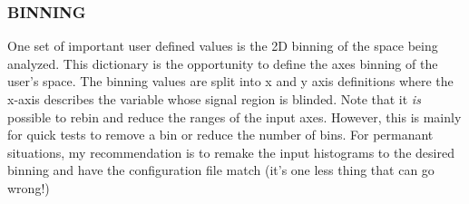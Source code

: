 \documentclass[letter]{article}
\begin{document}
        \subsubsection{BINNING}
            One set of important user defined values is the 2D binning of the space being analyzed. This dictionary is the opportunity to define the axes binning of the user's space. The binning values are split into x and y axis definitions where the x-axis describes the variable whose signal region is blinded. Note that it \textit{is} possible to rebin and reduce the ranges of the input axes. However, this is mainly for quick tests to remove a bin or reduce the number of bins. For permanant situations, my recommendation is to remake the input histograms to the desired binning and have the configuration file match (it's one less thing that can go wrong!)
            
\end{document}
